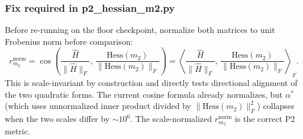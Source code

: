 \documentclass[11pt]{amsart}
\begin{document}
\subsubsection*{Fix required in p2\_hessian\_m2.py}

Before re-running on the floor checkpoint, normalize both matrices
to unit Frobenius norm before comparison:
\[
  r_{m_2}^\mathrm{norm} = \cos\!\left(
    \frac{\hat{H}}{\|\hat{H}\|_F},\,
    \frac{\mathrm{Hess}(m_2)}{\|\mathrm{Hess}(m_2)\|_F}
  \right)
  = \left\langle
    \frac{\hat{H}}{\|\hat{H}\|_F},\,
    \frac{\mathrm{Hess}(m_2)}{\|\mathrm{Hess}(m_2)\|_F}
  \right\rangle_F.
\]
This is scale-invariant by construction and directly tests
directional alignment of the two quadratic forms.
The current cosine formula already normalizes, but $\alpha^*$
(which uses unnormalized inner product divided by $\|\mathrm{Hess}(m_2)\|_F^2$)
collapses when the two scales differ by $\sim 10^6$.
The scale-normalized $r_{m_2}^\mathrm{norm}$ is the correct P2 metric.
\end{document}

